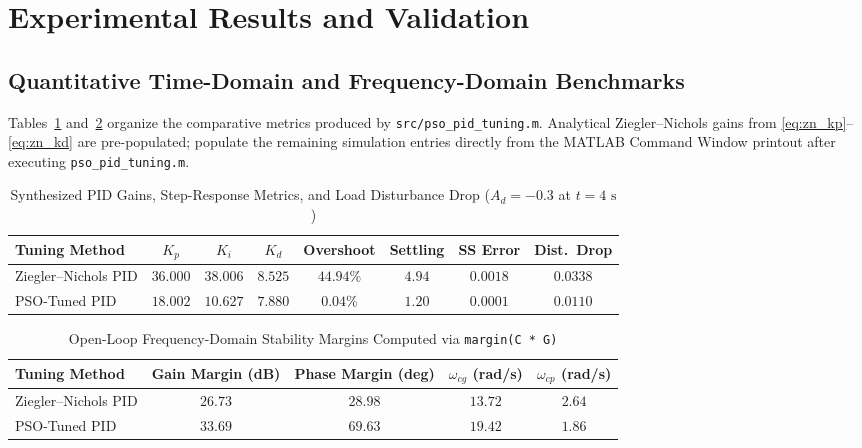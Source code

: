 \documentclass[11pt,a4paper]{article}
\begin{document}
\section{Experimental Results and Validation}

\subsection{Quantitative Time-Domain and Frequency-Domain Benchmarks}
Tables~\ref{tab:time_results} and~\ref{tab:freq_results} organize the comparative metrics produced by \texttt{src/pso\_pid\_tuning.m}. Analytical Ziegler--Nichols gains from \eqref{eq:zn_kp}--\eqref{eq:zn_kd} are pre-populated; populate the remaining simulation entries directly from the MATLAB Command Window printout after executing \texttt{pso\_pid\_tuning.m}.

\begin{table}[H]
  \centering
  \caption{Synthesized PID Gains, Step-Response Metrics, and Load Disturbance Drop ($A_d = -0.3$ at $t = 4\text{ s}$)}
  \label{tab:time_results}
  \small
  \begin{tabular}{lccccccc}
    \toprule
    \textbf{Tuning Method} & $K_p$ & $K_i$ & $K_d$ & \textbf{Overshoot} & \textbf{Settling} & \textbf{SS Error} & \textbf{Dist.\ Drop} \\
    \midrule
    Ziegler--Nichols PID & $36.000$ & $38.006$ & $8.525$ & $44.94\%$ & $4.94$ & $0.0018$ & $0.0338$ \\
    PSO-Tuned PID        & $18.002$ & $10.627$ & $7.880$ & $0.04\%$ & $1.20$ & $0.0001$ & $0.0110$ \\
    \bottomrule
  \end{tabular}
\end{table}

\begin{table}[H]
  \centering
  \caption{Open-Loop Frequency-Domain Stability Margins Computed via \texttt{margin(C * G)}}
  \label{tab:freq_results}
  \small
  \begin{tabular}{lcccc}
    \toprule
    \textbf{Tuning Method} & \textbf{Gain Margin (dB)} & \textbf{Phase Margin (deg)} & $\omega_{cg}$ \textbf{(rad/s)} & $\omega_{cp}$ \textbf{(rad/s)} \\
    \midrule
    Ziegler--Nichols PID & $26.73$ & $28.98$ & $13.72$ & $2.64$ \\
    PSO-Tuned PID        & $33.69$ & $69.63$ & $19.42$ & $1.86$ \\
    \bottomrule
  \end{tabular}
\end{table}
\end{document}
